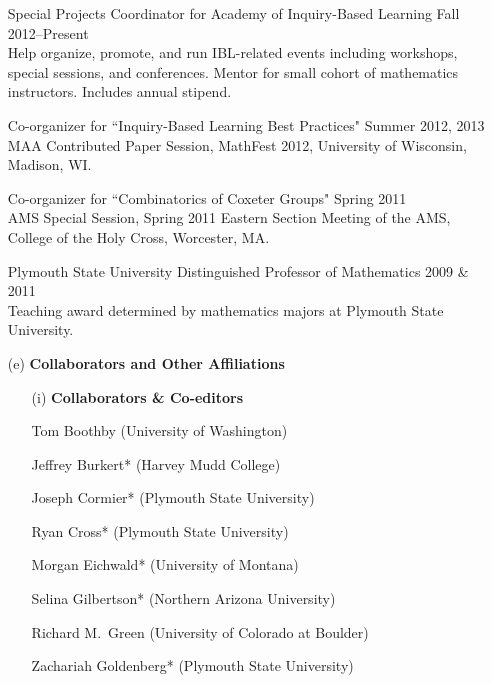 \documentclass[11pt]{article}
\begin{document}
\begin{enumerate}[leftmargin=*]
Special Projects Coordinator for Academy of Inquiry-Based Learning \hfill Fall 2012--Present\\
Help organize, promote, and run IBL-related events including workshops, special sessions, and conferences. Mentor for small cohort of mathematics instructors.  Includes annual stipend.

\smallskip

Co-organizer for ``Inquiry-Based Learning Best Practices" \hfill Summer 2012, 2013\\
MAA Contributed Paper Session, MathFest 2012, University of Wisconsin, Madison, WI.

\smallskip

Co-organizer for ``Combinatorics of Coxeter Groups" \hfill Spring 2011\\
AMS Special Session, Spring 2011 Eastern Section Meeting of the AMS, College of the Holy Cross, Worcester, MA.

\smallskip
 
Plymouth State University Distinguished Professor of Mathematics \hfill 2009 \& 2011\\
Teaching award determined by mathematics majors at Plymouth State University.

\item[(e)] \textbf{Collaborators and Other Affiliations} 
 
\begin{enumerate}[leftmargin=\parindent]
\item[(i)] \textbf{Collaborators \& Co-editors}

% 

Tom Boothby (University of Washington)

Jeffrey Burkert* (Harvey Mudd College)

Joseph Cormier* (Plymouth State University)

Ryan Cross* (Plymouth State University)

Morgan Eichwald* (University of Montana)

Selina Gilbertson* (Northern Arizona University)

Richard M.~Green (University of Colorado at Boulder)

Zachariah Goldenberg* (Plymouth State University)


\end{enumerate}
\end{enumerate}
\end{document}
